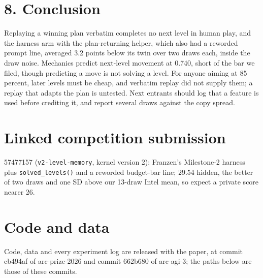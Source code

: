 \documentclass[
  11pt,
]{article}
\begin{document}
\section{8. Conclusion}\label{conclusion}

Replaying a winning plan verbatim completes no next level in human play,
and the harness arm with the plan-returning helper, which also had a
reworded prompt line, averaged 3.2 points below its twin over two draws
each, inside the draw noise. Mechanics predict next-level movement at
0.740, short of the bar we filed, though predicting a move is not
solving a level. For anyone aiming at 85 percent, later levels must be
cheap, and verbatim replay did not supply them; a replay that adapts the
plan is untested. Next entrants should log that a feature is used before
crediting it, and report several draws against the copy spread.

\section{Linked competition
submission}\label{linked-competition-submission}

57477157 (\texttt{v2-level-memory}, kernel version 2): Franzen's
Milestone-2 harness plus \texttt{solved\_levels()} and a reworded
budget-bar line; 29.54 hidden, the better of two draws and one SD above
our 13-draw Intel mean, so expect a private score nearer 26.

\section{Code and data}\label{code-and-data}

\begingroup\raggedright

Code, data and every experiment log are released with the paper, at
commit cb494af of arc-prize-2026 and commit 662b680 of arc-agi-3; the
paths below are those of these commits.
\end{document}
